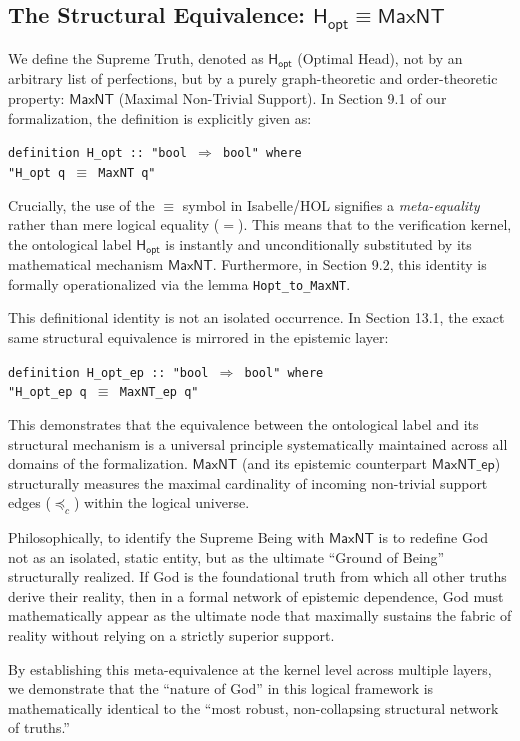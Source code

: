 \documentclass[a4paper, 11pt]{article}
\theoremstyle{plain}
\theoremstyle{definition}
\newcommand{\Hopt}{\mathsf{H_{opt}}}       %
\begin{document}
\subsection{The Structural Equivalence: $\Hopt \equiv \mathsf{MaxNT}$}
We define the Supreme Truth, denoted as $\Hopt$ (Optimal Head), not by an arbitrary list of perfections, but by a purely graph-theoretic and order-theoretic property: $\mathsf{MaxNT}$ (Maximal Non-Trivial Support). In Section 9.1 of our formalization, the definition is explicitly given as:
\begin{center}
    \texttt{definition H\_opt :: "bool $\Rightarrow$ bool" where}\\
    \texttt{"H\_opt q $\equiv$ MaxNT q"}
\end{center}
Crucially, the use of the $\equiv$ symbol in Isabelle/HOL signifies a \textit{meta-equality} rather than mere logical equality ($=$). This means that to the verification kernel, the ontological label $\Hopt$ is instantly and unconditionally substituted by its mathematical mechanism $\mathsf{MaxNT}$. Furthermore, in Section 9.2, this identity is formally operationalized via the lemma \texttt{Hopt\_to\_MaxNT}.

This definitional identity is not an isolated occurrence. In Section 13.1, the exact same structural equivalence is mirrored in the epistemic layer:
\begin{center}
    \texttt{definition H\_opt\_ep :: "bool $\Rightarrow$ bool" where}\\
    \texttt{"H\_opt\_ep q $\equiv$ MaxNT\_ep q"}
\end{center}
This demonstrates that the equivalence between the ontological label and its structural mechanism is a universal principle systematically maintained across all domains of the formalization. $\mathsf{MaxNT}$ (and its epistemic counterpart $\mathsf{MaxNT\_ep}$) structurally measures the maximal cardinality of incoming non-trivial support edges ($\preceq_c$) within the logical universe.

Philosophically, to identify the Supreme Being with $\mathsf{MaxNT}$ is to redefine God not as an isolated, static entity, but as the ultimate ``Ground of Being'' structurally realized. If God is the foundational truth from which all other truths derive their reality, then in a formal network of epistemic dependence, God must mathematically appear as the ultimate node that maximally sustains the fabric of reality without relying on a strictly superior support.

By establishing this meta-equivalence at the kernel level across multiple layers, we demonstrate that the ``nature of God'' in this logical framework is mathematically identical to the ``most robust, non-collapsing structural network of truths.''
\end{document}

